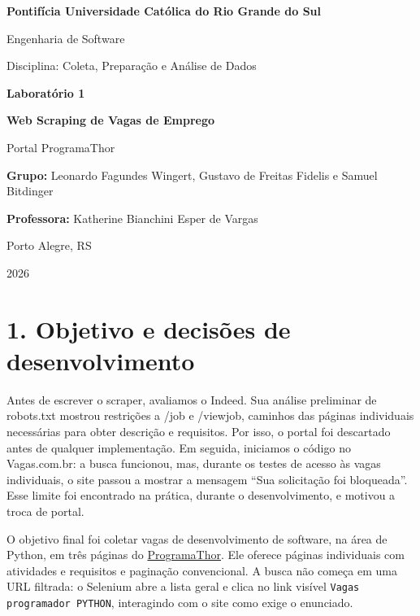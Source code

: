 \documentclass[10pt,a4paper]{article}
\begin{document}
\begin{titlepage}
\centering
{\large \textbf{Pontifícia Universidade Católica do Rio Grande do Sul}\par}
\vspace{0.5cm}
{\normalsize Engenharia de Software\par}
\vspace{0.5cm}
{\normalsize Disciplina: Coleta, Preparação e Análise de Dados\par}
\vfill
{\Large\bfseries Laboratório 1\par}
\vspace{0.35cm}
{\LARGE\bfseries Web Scraping de Vagas de Emprego\par}
\vspace{0.5cm}
{\large Portal ProgramaThor\par}
\vfill
\begin{minipage}{0.77\textwidth}
\textbf{Grupo:} Leonardo Fagundes Wingert, Gustavo de Freitas Fidelis e Samuel Bitdinger\par
\vspace{0.8cm}
\textbf{Professora:} Katherine Bianchini Esper de Vargas\par
\end{minipage}
\vfill
{Porto Alegre, RS\par}
{2026\par}
\end{titlepage}

\section*{1. Objetivo e decisões de desenvolvimento}

Antes de escrever o scraper, avaliamos o Indeed. Sua análise preliminar de robots.txt mostrou restrições a /job e /viewjob, caminhos das páginas individuais necessárias para obter descrição e requisitos. Por isso, o portal foi descartado antes de qualquer implementação. Em seguida, iniciamos o código no Vagas.com.br: a busca funcionou, mas, durante os testes de acesso às vagas individuais, o site passou a mostrar a mensagem ``Sua solicitação foi bloqueada''. Esse limite foi encontrado na prática, durante o desenvolvimento, e motivou a troca de portal.

O objetivo final foi coletar vagas de desenvolvimento de software, na área de Python, em três páginas do \href{https://programathor.com.br/jobs}{ProgramaThor}. Ele oferece páginas individuais com atividades e requisitos e paginação convencional. A busca não começa em uma URL filtrada: o Selenium abre a lista geral e clica no link visível \texttt{Vagas programador PYTHON}, interagindo com o site como exige o enunciado.
\end{document}
